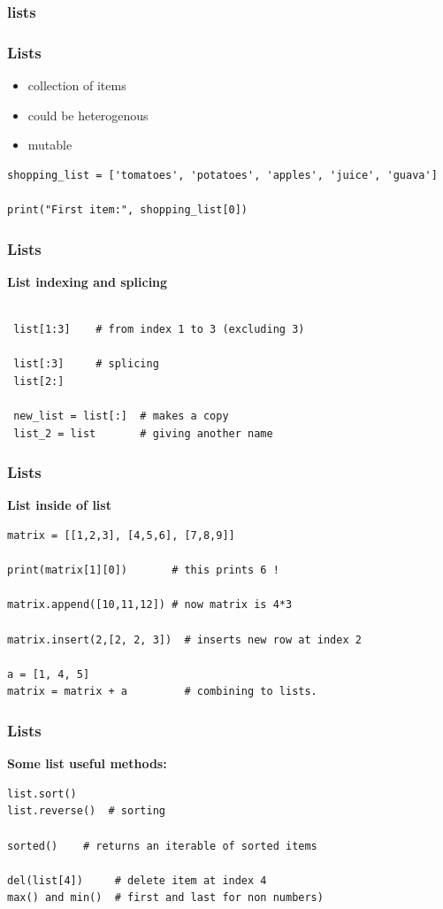 \documentclass[12pt, aspectratio=169]{beamer}
\begin{document}
\subsubsection{lists}
\begin{frame}[fragile]
  \frametitle{Lists}
  \begin{itemize}
  \item collection of items
  \item could be heterogenous
  \item mutable
  \end{itemize}
  \vspace{2em}
\begin{verbatim}
shopping_list = ['tomatoes', 'potatoes', 'apples', 'juice', 'guava']

print("First item:", shopping_list[0])
\end{verbatim}
\end{frame}

\begin{frame}[fragile]
  \frametitle{Lists}
\textbf{List indexing and splicing}
\vspace{2em}
\begin{verbatim}

 list[1:3]    # from index 1 to 3 (excluding 3)

 list[:3]     # splicing
 list[2:]

 new_list = list[:]  # makes a copy
 list_2 = list       # giving another name

\end{verbatim}
\end{frame}

\begin{frame}[fragile]
  \frametitle{Lists}
\textbf{List inside of list}
\begin{verbatim}
matrix = [[1,2,3], [4,5,6], [7,8,9]]

print(matrix[1][0])       # this prints 6 !

matrix.append([10,11,12]) # now matrix is 4*3

matrix.insert(2,[2, 2, 3])  # inserts new row at index 2

a = [1, 4, 5]  
matrix = matrix + a         # combining to lists.
\end{verbatim}
\end{frame}

\begin{frame}[fragile]
  \frametitle{Lists}
\textbf{Some list useful methods: }
\begin{verbatim}
list.sort()
list.reverse()  # sorting

sorted()    # returns an iterable of sorted items

del(list[4])     # delete item at index 4
max() and min()  # first and last for non numbers)
\end{verbatim}
\end{frame}
\end{document}
